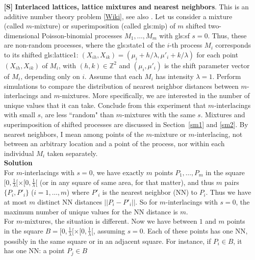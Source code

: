 \documentclass[10pt]{article}
\begin{document}
\begin{Exercise}\label{exercise14e}{\bf [S]} {\bf Interlaced lattices, lattice mixtures and nearest neighbors}.  This is an additive number theory problem [\href{https://en.wikipedia.org/wiki/Additive_number_theory}{Wiki}], see also \cite{ant}. 
Let us consider a \textcolor{index}{mixture} (called \textcolor{index}{$m$-mixture}) or 
\textcolor{index}{superimposition} (called \gls{gls:mip})  
of $m$ \textcolor{index}{shifted} two-dimensional Poisson-binomial processes $M_1,\dots,M_m$ with \gls{gls:sf} 
$s=0$.  Thus, these are  non-random processes, where the \gls{gls:state1} of the $i$-th process $M_i$ corresponds to its shifted \gls{gls:lattice1}: $(X_{ih},X_{ik})=(\mu_i+h/\lambda,\mu'_i+k/\lambda)$ for each point $(X_{ih},X_{ik})$ 
of $M_i$, with $(h,k)\in\mathbb{Z}^2$ and $(\mu_i,\mu'_i)$ is the shift parameter vector of $M_i$, depending only on $i$. Assume that each $M_i$ has intensity $\lambda=1$. Perform simulations to 
compare the distribution of \textcolor{index}{nearest neighbor distances} between $m$-interlacings and $m$-mixtures.  More specifically, we are interested in the number of unique values that it can take. Conclude from this experiment that $m$-interlacings with small $s$, are less ``random" than $m$-mixtures with the same $s$. Mixtures and superimposition of shifted processes are discussed in Section~\ref{sm1} and \ref{sm2}. By nearest neighbors, I mean among points of the $m$-mixture or $m$-interlacing, not between an arbitrary location and a point of the process, nor within each individual $M_i$ taken separately. \vspace{1ex} \\
{\bf Solution}\vspace{1ex} \\
For $m$-interlacings with $s=0$, we have exactly $m$ points $P_1,\dots,P_m$ in the square $[0, \frac{1}{\lambda}[ \times [0, \frac{1}{\lambda}[$ (or in any square of same area, for that matter), and thus $m$ pairs $\{P_i, P'_i\}$  ($i=1,\dots,m$) where $P'_i$ is the nearest neighbor (NN) to $P_i$.
Thus we have at most $m$ distinct NN distances $||P_i-P'_i||$. So for $m$-interlacings with $s=0$, the maximum number of unique values for the NN distance is $m$. \vspace{1ex} \\
For $m$-mixtures, the situation is different. Now we have between $1$ and $m$ points in the square $B=[0, \frac{1}{\lambda}[ \times [0, \frac{1}{\lambda}[$, assuming $s=0$. Each of these points has one NN, possibly in the same square or in an adjacent square. For instance, if $P_i\in B$, it has one NN: a point $P_j\in B$

\end{Exercise}
\end{document}
